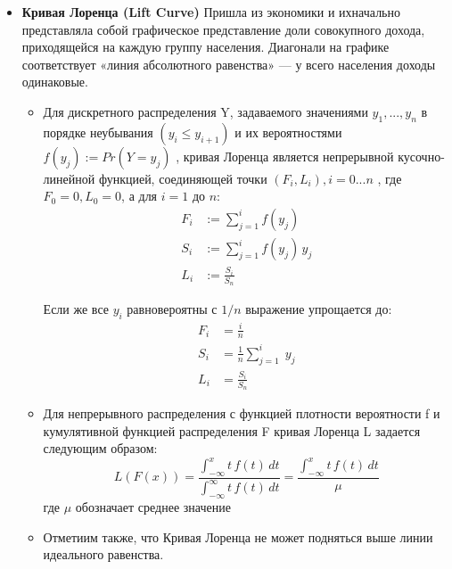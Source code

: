 \begin{itemize}
    \item {\bf Кривая Лоренца (Lift Curve)} Пришла из экономики и ихначально представляла собой графическое представление доли совокупного дохода, приходящейся на каждую группу населения. Диагонали на графике соответствует «линия абсолютного равенства» — у всего населения доходы одинаковые.

          \begin{itemize}
              \item Для дискретного распределения Y, задаваемого значениями $y_1, ..., y_n$ в порядке неубывания $(y_i \leq y_{i+1})$ и их
                    вероятностями $f(y_j) := Pr ( Y = y_j )$ , кривая
                    Лоренца является непрерывной кусочно-линейной функцией, соединяющей точки $( F_i , L_i ), i = 0...n$ , где
                    $F_0 = 0, L_0 = 0$, а для $i = 1$ до $n$:
                    $${\displaystyle {\begin{aligned}F_{i}&:=\sum _{j=1}^{i}f(y_{j})\\S_{i}&:=\sum _{j=1}^{i}f(y_{j})\,y_{j}\\L_{i}&:={\frac {S_{i}}{S_{n}}}\end{aligned}}}$$

                    Если же все $y_i$ равновероятны с $1/n$ выражение упрощается до:
                    $${\displaystyle {\begin{aligned}F_{i}&={\frac {i}{n}}\\S_{i}&={\frac {1}{n}}\sum _{j=1}^{i}\;y_{j}\\L_{i}&={\frac {S_{i}}{S_{n}}}\end{aligned}}}$$

              \item Для непрерывного распределения с функцией плотности вероятности f и кумулятивной функцией распределения F кривая Лоренца L задается следующим образом:
                    $${\displaystyle L(F(x))={\frac {\int _{-\infty }^{x}t\,f(t)\,dt}{\int _{-\infty }^{\infty }t\,f(t)\,dt}}={\frac {\int _{-\infty }^{x}t\,f(t)\,dt}{\mu }}}$$
                    где $\mu$ обозначает среднее значение

              \item Отметиим также, что Кривая Лоренца не может подняться выше линии идеального равенства.
          \end{itemize}




\end{itemize}

